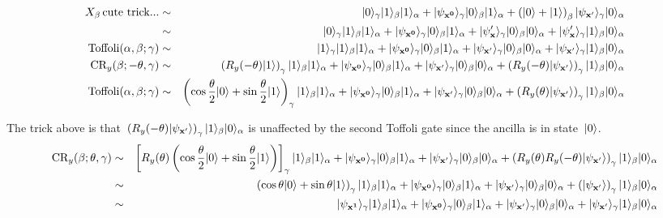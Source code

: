 \documentclass{article}
\DeclarePairedDelimiter\ket{\lvert}{\rangle}
\begin{document}
\begin{eqnarray*}
X_\beta \, \mbox{cute trick...} &\sim&  \ket{0}_\gamma \ket{1}_\beta \ket{1}_\alpha + \ket{\psi_{\bf x^0}}_\gamma \ket{0}_\beta \ket{1}_\alpha + \left( \ket{0} + \ket{1} \right)_\beta \ket{\psi_{\bf x^\prime}}_\gamma \ket{0}_\alpha \\
&\sim&  \ket{0}_\gamma \ket{1}_\beta \ket{1}_\alpha + \ket{\psi_{\bf x^0}}_\gamma \ket{0}_\beta \ket{1}_\alpha + \ket{\psi_{\bf x}^\prime}_\gamma \ket{0}_\beta \ket{0}_\alpha + \ket{\psi_{\bf x}^\prime}_\gamma \ket{1}_\beta \ket{0}_\alpha \\
\mbox{Toffoli}(\alpha, \beta ; \gamma)  &\sim&  \ket{1}_\gamma \ket{1}_\beta \ket{1}_\alpha + \ket{\psi_{\bf x^0}}_\gamma \ket{0}_\beta \ket{1}_\alpha + \ket{\psi_{\bf x^\prime}}_\gamma \ket{0}_\beta \ket{0}_\alpha + \ket{\psi_{\bf x^\prime}}_\gamma \ket{1}_\beta \ket{0}_\alpha \\
\mbox{CR}_y (\beta ; - \theta, \gamma)  &\sim& \left( R_y(- \theta) \ket{ 1} \right)_\gamma \ket{1}_\beta \ket{1}_\alpha + \ket{\psi_{\bf x^0}}_\gamma \ket{0}_\beta \ket{1}_\alpha + \ket{\psi_{\bf x^\prime}}_\gamma \ket{0}_\beta \ket{0}_\alpha +  \left( R_y(- \theta) \ket{\psi_{\bf x^\prime}} \right)_\gamma \ket{1}_\beta \ket{0}_\alpha \\
\mbox{Toffoli} (\alpha, \beta ; \gamma)  &\sim& \left( \cos \frac{\theta}{2} \ket{0} + \sin \frac{\theta}{2} \ket{1} \right)_\gamma \ket{1}_\beta \ket{1}_\alpha + \ket{\psi_{\bf x^0}}_\gamma \ket{0}_\beta \ket{1}_\alpha + \ket{\psi_{\bf x^\prime}}_\gamma \ket{0}_\beta \ket{0}_\alpha +  \left( R_y(\theta) \ket{\psi_{\bf x^\prime}} \right)_\gamma \ket{1}_\beta \ket{0}_\alpha
\end{eqnarray*}

\noindent The trick above is that~$\left( R_y(- \theta) \ket{\psi_{\bf x^\prime}} \right)_\gamma \ket{1}_\beta \ket{0}_\alpha$ is unaffected by the second Toffoli gate since the ancilla is in state~$\ket{0}$.
\begin{eqnarray*}
\mbox{CR}_y (\beta ; \theta , \gamma)  &\sim& \left[ R_y(\theta) \left(  \cos \frac{\theta}{2} \ket{0} + \sin \frac{\theta}{2} \ket{1} \right) \right]_\gamma \ket{1}_\beta \ket{1}_\alpha + \ket{\psi_{\bf x^0}}_\gamma \ket{0}_\beta \ket{1}_\alpha + \ket{\psi_{\bf x^\prime}}_\gamma \ket{0}_\beta \ket{0}_\alpha +  \left( R_y(\theta) R_y(-\theta) \ket{\psi_{\bf x^\prime}} \right)_\gamma \ket{1}_\beta \ket{0}_\alpha \\
 &\sim& \left( \cos \theta \ket{0} + \sin \theta \ket{1} \right)_\gamma \ket{1}_\beta \ket{1}_\alpha + \ket{\psi_{\bf x^0}}_\gamma \ket{0}_\beta \ket{1}_\alpha + \ket{\psi_{\bf x^\prime}}_\gamma \ket{0}_\beta \ket{0}_\alpha +  \left( \ket{\psi_{\bf x^\prime}} \right)_\gamma \ket{1}_\beta \ket{0}_\alpha \\
  &\sim& \ket{\psi_{\bf x^1}}_\gamma \ket{1}_\beta \ket{1}_\alpha + \ket{\psi_{\bf x^0}}_\gamma \ket{0}_\beta \ket{1}_\alpha + \ket{\psi_{\bf x^\prime}}_\gamma \ket{0}_\beta \ket{0}_\alpha + \ket{\psi_{\bf x^\prime}}_\gamma \ket{1}_\beta \ket{0}_\alpha
\end{eqnarray*}
\end{document}
